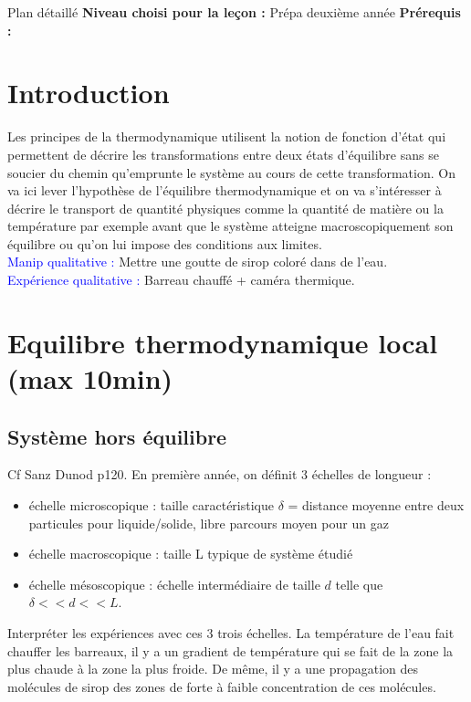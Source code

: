 \begin{reportBlock}{Plan détaillé}
  \textbf{Niveau choisi pour la leçon :} Prépa deuxième année
  \newline
  \textbf{Prérequis : }
  \newline

\section*{Introduction}
Les principes de la thermodynamique utilisent la notion de fonction d'état qui permettent de décrire les transformations entre deux états d'équilibre sans se soucier du chemin qu'emprunte le système au cours de cette transformation. On va ici lever l'hypothèse de l'équilibre thermodynamique et on va s'intéresser à décrire le transport de quantité physiques comme la quantité de matière ou la température par exemple avant que le système atteigne macroscopiquement son équilibre ou qu'on lui impose des conditions aux limites.\\

\textcolor{blue}{Manip qualitative :} Mettre une goutte de sirop coloré dans de l'eau.\\

\textcolor{blue}{Expérience qualitative :} Barreau  chauffé + caméra thermique.

\section{Equilibre thermodynamique local (max 10min)}

\subsection{Système hors équilibre}
Cf Sanz Dunod p120. En première année, on définit 3 échelles de longueur :
\begin{itemize}
    \item échelle microscopique : taille caractéristique $\delta$ = distance moyenne entre deux particules pour liquide/solide, libre parcours moyen pour un gaz
    \item échelle macroscopique : taille L typique de système étudié
    \item échelle mésoscopique : échelle intermédiaire de taille $d$ telle que $\delta<<d<<L$.
\end{itemize}
Interpréter les expériences avec ces 3 trois échelles. La température de l'eau fait chauffer les barreaux, il y a un gradient de température qui se fait de la zone la plus chaude à la zone la plus froide. De même, il y a une propagation des molécules de sirop des zones de forte à faible concentration de ces molécules. \\


\end{reportBlock}
